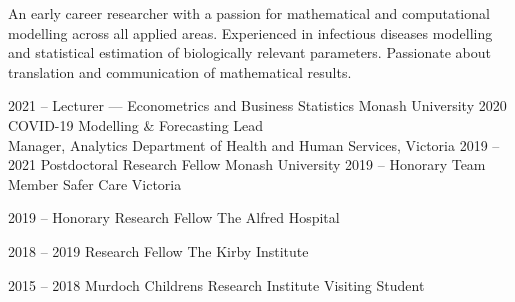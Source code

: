 \documentclass[9pt]{developercv} %
\begin{document}
\vspace{0.5cm}



\begin{minipage}[t]{0.4\textwidth} %
	\vspace{-\baselineskip} %
	
	An early career researcher with a passion for mathematical and computational modelling across all applied areas.
	Experienced in infectious diseases modelling and statistical estimation of biologically relevant parameters.
	Passionate about translation and communication of mathematical results.\\ %
\end{minipage}
\hfill %
\begin{minipage}[t]{0.5\textwidth} %
	\vspace{-\baselineskip} %
	\begin{barchart}{5.5}
	\end{barchart}
\end{minipage}



\begin{entrylist}
	\appointment
		{2021 -- }
		{Lecturer --- Econometrics and Business Statistics}
		{Monash University}
	\appointment
		{2020}
		{COVID-19 Modelling \& Forecasting Lead \\ Manager, Analytics}
		{Department of Health and Human Services, Victoria}
	\appointment
		{2019 -- 2021}
		{Postdoctoral Research Fellow}
		{Monash University}
	\appointment
		{2019 --}
		{Honorary Team Member}
		{Safer Care Victoria}

	\appointment
	    {2019 --}
	    {Honorary Research Fellow}
	    {The Alfred Hospital}

	\appointment
	    {2018 -- 2019}
	    {Research Fellow}
	    {The Kirby Institute}

	\appointment
	    {2015 -- 2018}
	    {Murdoch Childrens Research Institute}
	    {Visiting Student}
\end{entrylist}
\end{document}
